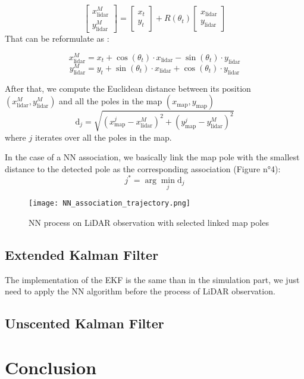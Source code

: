 \documentclass[conference]{IEEEtran}
\begin{document}
\[
\begin{bmatrix}
x_{\text{lidar}}^{M} \\
y_{\text{lidar}}^{M}
\end{bmatrix}
=
\begin{bmatrix}
x_t \\
y_t
\end{bmatrix} 
+
R(\theta_t)
\begin{bmatrix}
x_{\text{lidar}} \\
y_{\text{lidar}}
\end{bmatrix}
\]
\noindent That can be reformulate as :

\[
x_{\text{lidar}}^{M} = x_t + \cos(\theta_t) \cdot x_{\text{lidar}} - \sin(\theta_t) \cdot y_{\text{lidar}}
\]
\[
y_{\text{lidar}}^{M} = y_t + \sin(\theta_t) \cdot x_{\text{lidar}} + \cos(\theta_t) \cdot y_{\text{lidar}}
\]

\noindent After that, we compute the Euclidean distance between its position \((x_{\text{lidar}}^{M}, y_{\text{lidar}}^{M})\) and all the poles in the map \((x_{\text{map}}, y_{\text{map}})\)
\[
\text{d}_{j} = \sqrt{(x_{\text{map}}^j - x_{\text{lidar}}^{M})^2 + (y_{\text{map}}^j - y_{\text{lidar}}^{M})^2}
\]
where \(j\) iterates over all the poles in the map.

\vspace{2mm}

\noindent In the case of a NN association, we basically link the map pole with the smallest distance to the detected pole as the corresponding association (Figure n°4):
\[
j^* = \arg\min_j \text{d}_j
\]

\begin{figure}[H]
    \centering
    \texttt{[image: NN\_association\_trajectory.png]}
    \caption{NN process on LiDAR observation with selected linked map poles}
    \label{fig:enter-label}
\end{figure}


\subsection{Extended Kalman Filter}

The implementation of the EKF is the same than in the simulation part, we just need to apply the NN algorithm before the process of LiDAR observation.

\subsection{Unscented Kalman Filter}

\section{Conclusion}
\end{document}
